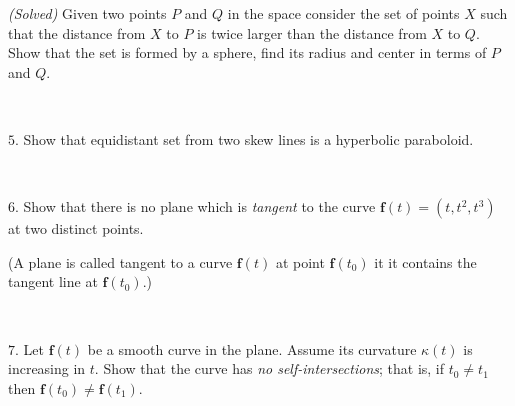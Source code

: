 \documentclass{article}
\def\noi{\noindent}%
\begin{document}
\noi
{}\textit{(Solved)} Given two points $P$ and $Q$ in the space consider the set of points $X$ such that the distance from $X$ to $P$ is twice larger than the distance from $X$ to $Q$.
Show that the set is formed by a sphere, find its radius and center in terms of $P$ and $Q$.

\ 

\noi
$5$. Show that equidistant set from two skew lines is a hyperbolic paraboloid.

\ 

\noi
$6$. Show that there is no plane which is \emph{tangent} to the curve $\textbf{f}(t)=(t,t^2,t^3)$ at two distinct points. 

(A plane is called tangent to a curve $\textbf{f}(t)$ at point $\textbf{f}(t_0)$ it it contains the tangent line at $\textbf{f}(t_0)$.)

\ 

\noi
$7$. Let $\textbf{f}(t)$ be a smooth curve in the plane.
Assume its curvature $\kappa(t)$ is increasing in $t$.
Show that the curve has \emph{no self-intersections};
that is, if $t_0\ne t_1$ then $\textbf{f}(t_0)\ne\textbf{f}(t_1)$.
\end{document}
